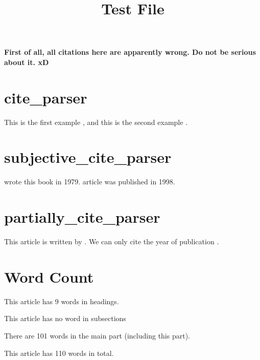 \documentclass[a4paper]{article}
\title{Test File}
\author{}
\date{}
\begin{document}
 \maketitle

\par{\large{\textbf{First of all, all citations here are apparently wrong. Do not be serious about it. xD}}}\\

\section{cite\_parser}
\par{This is the first example \cite{lake_tailoring_1998}, and this is the second example . }

\section{subjective\_cite\_parser}
\par{ wrote this book in 1979.  article was published in 1998. }

\section{partially\_cite\_parser}
\par{This article is written by . We can only cite the year of publication \citeyear{lock_visibility_2014}.}

\section{Word Count}
\par{This article has 9 words in headings.}
\par{This article has no word in subsections}
\par{There are 101 words in the main part (including this part). }
\par{This article has 110 words in total.}

\newpage


\end{document}
